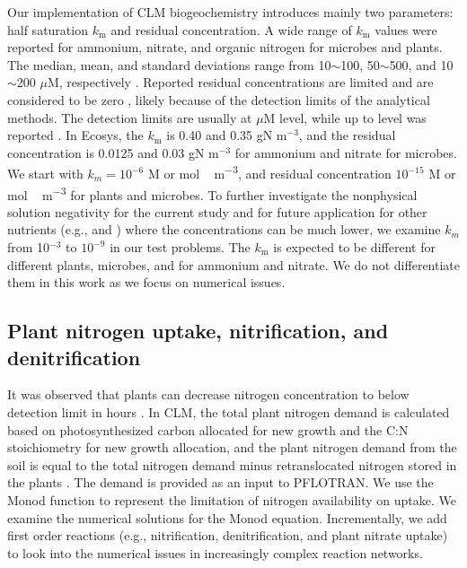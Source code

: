 \documentclass[gmd, manuscript]{copernicus}
\begin{document}
Our implementation of CLM biogeochemistry introduces mainly two parameters: half saturation $k_\text{m}$ and residual concentration. A wide range of $k_\text{m}$ values were reported for ammonium, nitrate, and organic nitrogen for microbes and plants. The median, mean, and standard deviations range from 10$\sim$100, 50$\sim$500, and 10$\sim$200 $\mu$M, respectively
\citep{Kuzyakov2013}. Reported residual concentrations are limited and are considered to be zero \cite[e.g.,][]{Hogh1997}, likely because of the detection limits of the analytical methods. The detection limits are usually at
$\mu$M level, while up to  level was reported \citep{Nollet2013}. In Ecosys,
the $k_\text{m}$ is 0.40 and 0.35 gN m$^{-3}$, and the residual concentration
is 0.0125 and 0.03 gN m$^{-3}$ \citep{Grant2013} for ammonium and
nitrate for microbes.  
We start with $k_m=10^{-6}$ \unit{M} or \unit{mol\,m^{-3}},
and residual concentration $10^{-15}$ \unit{M} or \unit{mol\, m^{-3}} for
plants and microbes. To further investigate the nonphysical solution negativity for the
current study and for future application for other nutrients (e.g., 
and ) where the concentrations can be much lower, we examine $k_m$
from 10$^{-3}$ to $10^{-9}$ in our test problems. The $k_\text{m}$ is expected
to be different for different plants, microbes, and for ammonium and
nitrate. We do not differentiate them in this work as we focus on
numerical issues. 

\subsection{Plant nitrogen uptake, nitrification, and denitrification}
\label{sec:test1}
It was observed that plants can decrease nitrogen concentration to below
detection limit in hours \citep{Kamer2001}. 
In CLM, the total plant nitrogen demand is
calculated based on photosynthesized carbon allocated for new growth and the
C:N stoichiometry for new growth allocation, and the plant nitrogen demand from
the soil is equal to the total nitrogen demand minus retranslocated nitrogen
stored in the plants  \citep{Oleson2013}. The demand is provided
as an input to PFLOTRAN. We use the
Monod function to represent the limitation of nitrogen availability on uptake.
We examine the numerical solutions for the Monod equation. Incrementally, we
add first order reactions (e.g., nitrification, denitrification, and plant
nitrate uptake) to look into the numerical issues in increasingly complex reaction networks. 
\end{document}
